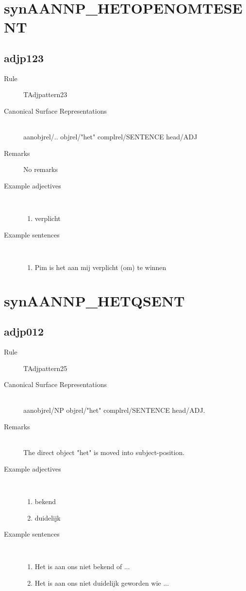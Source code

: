 \section{synAANNP\_HETOPENOMTESENT}
\subsection{adjp123}
\begin{description}
  \item [Rule] TAdjpattern23
  \item [Canonical Surface Representations]  \mbox{}\\ aanobjrel/.. objrel/"het" 
complrel/SENTENCE head/ADJ
  \item [Remarks] No remarks

  \item [Example adjectives]\mbox{}\\
\begin{enumerate}
  \item verplicht
\end{enumerate}
  \item [Example sentences]\mbox{}\\
\begin{enumerate}
  \item Pim is het aan mij verplicht (om) te winnen
\end{enumerate}
\end{description}
\newpage
\section{synAANNP\_HETQSENT}
\subsection{adjp012}
\begin{description}
  \item [Rule] TAdjpattern25
  \item [Canonical Surface Representations]  \mbox{}\\ 
aanobjrel/NP objrel/"het" complrel/SENTENCE head/ADJ.
  \item [Remarks] \mbox{}\\
The direct object "het" is moved into subject-position.

  \item [Example adjectives]\mbox{}\\
\begin{enumerate}
  \item bekend 
  \item duidelijk
\end{enumerate}
  \item [Example sentences]\mbox{}\\
\begin{enumerate}
  \item Het is aan ons niet bekend of ...
  \item Het is aan ons niet duidelijk geworden wie ...
\end{enumerate}
\end{description}
\newpage
